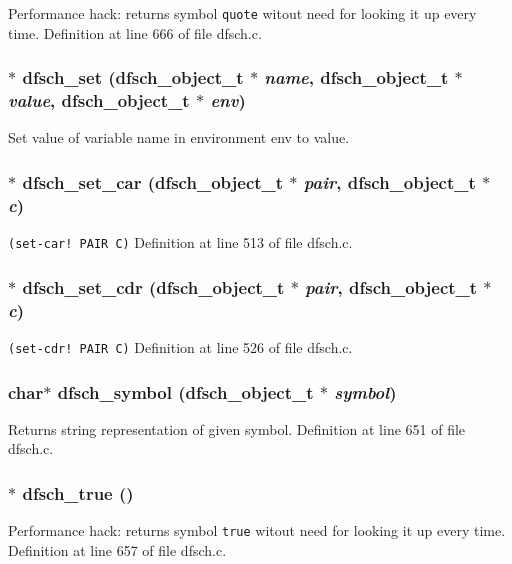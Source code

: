 Performance hack: returns symbol {\tt quote} witout need for looking it up every time. Definition at line 666 of file dfsch.c.
\subsubsection{$\ast$ dfsch\_\-set ({\bf dfsch\_\-object\_\-t} $\ast$ {\em name}, {\bf dfsch\_\-object\_\-t} $\ast$ {\em value}, {\bf dfsch\_\-object\_\-t} $\ast$ {\em env})}\label{dfsch_8h_a42}


Set value of variable name in environment env to value. 
\subsubsection{$\ast$ dfsch\_\-set\_\-car ({\bf dfsch\_\-object\_\-t} $\ast$ {\em pair}, {\bf dfsch\_\-object\_\-t} $\ast$ {\em c})}\label{dfsch_8h_a28}


{\tt (set-car! PAIR C)} Definition at line 513 of file dfsch.c.
\subsubsection{$\ast$ dfsch\_\-set\_\-cdr ({\bf dfsch\_\-object\_\-t} $\ast$ {\em pair}, {\bf dfsch\_\-object\_\-t} $\ast$ {\em c})}\label{dfsch_8h_a29}


{\tt (set-cdr! PAIR C)} Definition at line 526 of file dfsch.c.
\subsubsection{\setlength{\rightskip}{0pt plus 5cm}char$\ast$ dfsch\_\-symbol ({\bf dfsch\_\-object\_\-t} $\ast$ {\em symbol})}\label{dfsch_8h_a32}


Returns string representation of given symbol. Definition at line 651 of file dfsch.c.
\subsubsection{$\ast$ dfsch\_\-true ()}\label{dfsch_8h_a33}


Performance hack: returns symbol {\tt true} witout need for looking it up every time. Definition at line 657 of file dfsch.c.